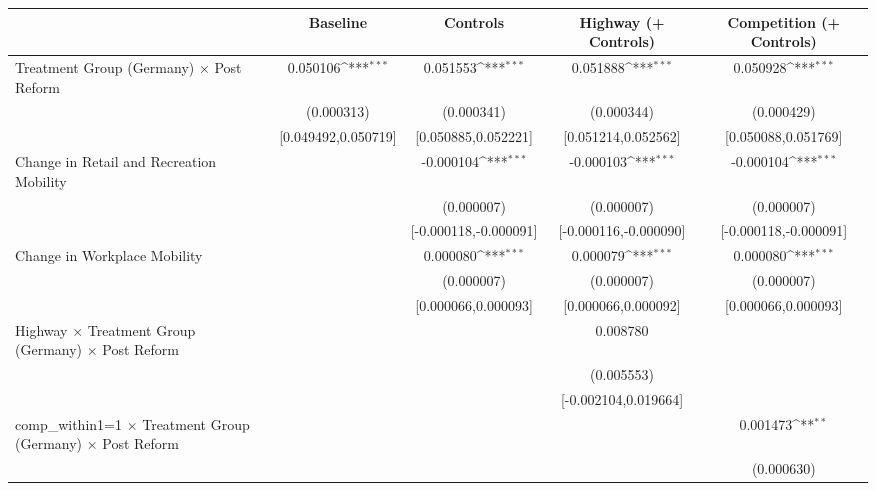 {
\def\sym#1{\ifmmode^{#1}\else\(^{#1}\)\fi}
\begin{tabular}{l*{4}{c}}
\toprule
                    &\multicolumn{1}{c}{Baseline}&\multicolumn{1}{c}{Controls}&\multicolumn{1}{c}{Highway (+ Controls)}&\multicolumn{1}{c}{Competition (+ Controls)}\\
\midrule
Treatment Group (Germany) $\times$ Post Reform&    0.050106\sym{***}&    0.051553\sym{***}&    0.051888\sym{***}&    0.050928\sym{***}\\
                    &  (0.000313)         &  (0.000341)         &  (0.000344)         &  (0.000429)         \\
                    &[0.049492,0.050719]         &[0.050885,0.052221]         &[0.051214,0.052562]         &[0.050088,0.051769]         \\
Change in Retail and Recreation Mobility&                     &   -0.000104\sym{***}&   -0.000103\sym{***}&   -0.000104\sym{***}\\
                    &                     &  (0.000007)         &  (0.000007)         &  (0.000007)         \\
                    &                     &[-0.000118,-0.000091]         &[-0.000116,-0.000090]         &[-0.000118,-0.000091]         \\
Change in Workplace Mobility&                     &    0.000080\sym{***}&    0.000079\sym{***}&    0.000080\sym{***}\\
                    &                     &  (0.000007)         &  (0.000007)         &  (0.000007)         \\
                    &                     &[0.000066,0.000093]         &[0.000066,0.000092]         &[0.000066,0.000093]         \\
Highway $\times$ Treatment Group (Germany) $\times$ Post Reform&                     &                     &    0.008780         &                     \\
                    &                     &                     &  (0.005553)         &                     \\
                    &                     &                     &[-0.002104,0.019664]         &                     \\
comp\_within1=1 $\times$ Treatment Group (Germany) $\times$ Post Reform&                     &                     &                     &    0.001473\sym{**} \\
                    &                     &                     &                     &  (0.000630)         \\

\end{tabular}}
